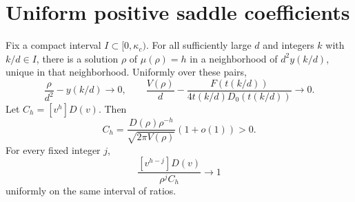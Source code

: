 \section{Uniform positive saddle coefficients}
\begin{lemma}\label{aud:fr:Gaussian}
Fix a compact interval $I\subset[0,\kappa_c)$. For all sufficiently large $d$ and integers $k$ with $k/d\in I$, there is a solution $\rho$ of $\mu(\rho)=h$ in a neighborhood of $d^2y(k/d)$, unique in that neighborhood. Uniformly over these pairs,
\begin{equation}\label{aud:fr:finitesaddle}
 \frac{\rho}{d^2}-y(k/d)\longrightarrow0,\qquad
 \frac{V(\rho)}d-\frac{F(t(k/d))}{4t(k/d)D_0(t(k/d))}\longrightarrow0.
\end{equation}
Let $C_h=[v^h]D(v)$. Then
\begin{equation}\label{aud:fr:positivecoefficient}
 C_h=\frac{D(\rho)\rho^{-h}}{\sqrt{2\pi V(\rho)}}(1+o(1))>0.
\end{equation}
For every fixed integer $j$,
\begin{equation}\label{aud:fr:coefficientratio}
 \frac{[v^{h-j}]D(v)}{\rho^j C_h}\longrightarrow1
\end{equation}
uniformly on the same interval of ratios.
\end{lemma}
